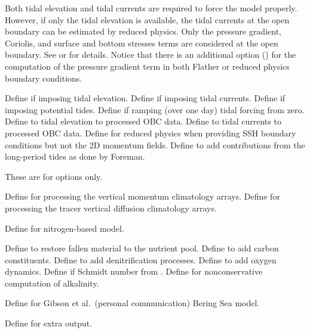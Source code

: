 \begin{klist}
Both tidal elevation and tidal currents are required to force the model
properly. However, if only the tidal elevation is available, the tidal
currents at the open boundary can be estimated by reduced physics.
Only the pressure gradient, Coriolis, and surface and bottom stresses
terms are considered at the open boundary. See  or
 for details. Notice that there is an additional option
() for the computation of the pressure gradient
term in both Flather or reduced physics boundary conditions.
  \begin{klist}
      Define if imposing tidal elevation.
      Define if imposing tidal currents.
      Define if imposing potential tides.
      Define if ramping (over one day) tidal forcing
     from zero.
      Define to tidal elevation to processed OBC data.
      Define to tidal currents to processed OBC data.
      Define for reduced physics when
     providing SSH boundary conditions but not the 2D momentum
     fields.
      Define to add contributions from the
     long-period tides as done by Foreman.
  \end{klist}
   These are for  options only.
  \begin{klist}
      Define for processing the vertical momentum
   climatology arrays.
      Define for processing the tracer
     vertical diffusion climatology arrays.
  \end{klist}
   \mbox{}
  \begin{klist}
     Define for \citet{Fennel_2006}
    nitrogen-based model.
    \begin{klist}
        Define to restore fallen material to the
       nutrient pool.
        Define to add carbon constituents.
        Define to add denitrification processes.
        Define to add oxygen dynamics.
        Define if Schmidt number from
       \citet{Keeling_98}.
        Define for nonconservative computation
       of alkalinity.
    \end{klist}
     Define for Gibson et al.\ (personal communication)
       Bering Sea model.
    \begin{klist}
       Define for extra output.

\end{klist}
\end{klist}
\end{klist}
